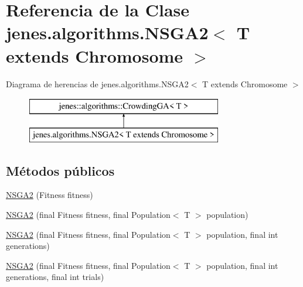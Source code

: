 \hypertarget{classjenes_1_1algorithms_1_1_n_s_g_a2_3_01_t_01extends_01_chromosome_01_4}{\section{Referencia de la Clase jenes.\-algorithms.\-N\-S\-G\-A2$<$ T extends Chromosome $>$}
\label{classjenes_1_1algorithms_1_1_n_s_g_a2_3_01_t_01extends_01_chromosome_01_4}
}
Diagrama de herencias de jenes.\-algorithms.\-N\-S\-G\-A2$<$ T extends Chromosome $>$\begin{figure}[H]
\begin{center}
\leavevmode
\includegraphics[height=2.000000cm]{classjenes_1_1algorithms_1_1_n_s_g_a2_3_01_t_01extends_01_chromosome_01_4}
\end{center}
\end{figure}
\subsection*{Métodos públicos}
\begin{DoxyCompactItemize}
\item 
\hyperlink{classjenes_1_1algorithms_1_1_n_s_g_a2_3_01_t_01extends_01_chromosome_01_4_a0e9264bdd3c0f0f73fecdc89038b2898}{N\-S\-G\-A2} (Fitness fitness)
\item 
\hyperlink{classjenes_1_1algorithms_1_1_n_s_g_a2_3_01_t_01extends_01_chromosome_01_4_a49f57f66489874c5bf12b3f9c89e6fcc}{N\-S\-G\-A2} (final Fitness fitness, final Population$<$ T $>$ population)
\item 
\hyperlink{classjenes_1_1algorithms_1_1_n_s_g_a2_3_01_t_01extends_01_chromosome_01_4_a4da7d36c029be00959ea063643833486}{N\-S\-G\-A2} (final Fitness fitness, final Population$<$ T $>$ population, final int generations)
\item 
\hyperlink{classjenes_1_1algorithms_1_1_n_s_g_a2_3_01_t_01extends_01_chromosome_01_4_ac0873ceec23f2908e64650b2e0f2b62a}{N\-S\-G\-A2} (final Fitness fitness, final Population$<$ T $>$ population, final int generations, final int trials)
\end{DoxyCompactItemize}
